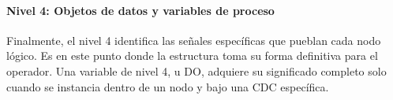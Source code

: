 


\paragraph{Nivel 4: Objetos de datos y variables de proceso}
Finalmente, el nivel 4 identifica las señales específicas que pueblan cada nodo lógico. Es en este punto donde la estructura toma su forma definitiva para el operador. Una variable de nivel 4, u \ac{DO}, adquiere su significado completo solo cuando se instancia dentro de un nodo y bajo una \ac{CDC} específica.

